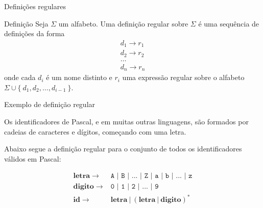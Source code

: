\begin{frame}[fragile]{Definições regulares}

    \begin{block}{Definição}
        Seja $\Sigma$ um alfabeto. Uma definição regular sobre $\Sigma$ é uma sequência de definições da forma
        \[
            \begin{array}{l}
                d_1 \to r_1 \\
                d_2 \to r_2 \\
                \ldots \\
                d_n \to r_n
            \end{array}
        \]
    onde cada $d_i$ é um nome distinto e $r_i$ uma expressão regular sobre o alfabeto
    $\Sigma \cup \{\ d_1, d_2, \ldots, d_{i - 1}\ \}$.
    \end{block}

\end{frame}

\begin{frame}[fragile]{Exemplo de definição regular}

    Os identificadores de Pascal, e em muitas outras linguagens, são formados por cadeias de caracteres e dígitos, começando com uma letra.
    \pause

    \vspace{0.2in}
    Abaixo segue a definição regular para o conjunto de todos os identificadores válidos em Pascal:
    \pause

    \vspace{0.2in}
    \[
        \begin{array}{rl}
            \mathbf{letra}\to & \texttt{A | B | ... | Z | a | b | ... | z} \\
            \mathbf{digito}\to & \texttt{0 | 1 | 2 | ... | 9} \\
            \mathbf{id}\to & \mathbf{letra}\ |\ (\mathbf{letra}\ |\ \mathbf{digito})^* 
        \end{array}
    \]

\end{frame}

